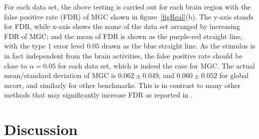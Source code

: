 \documentclass[11pt]{article}
\begin{document}
For each data set, the above testing is carried out for each brain region with the false positive rate (FDR) of MGC shown in figure~\ref{figReal}(b). The y-axis stands for FDR, while x-axis shows the name of the data set arranged by increasing FDR of MGC; and the mean of FDR is shown as the purple-red straight line, with the type $1$ error level $0.05$ drawn as the blue straight line. As the stimulus is in fact independent from the brain activities, the false positive rate should be close to $\alpha=0.05$ for each data set, which is indeed the case for MGC. The actual mean/standard deviation of MGC is $0.062 \pm 0.049$, and $0.060 \pm 0.052$ for global mcorr, and similarly for other benchmarks. This is in contrast to many other methods that may significantly increase FDR as reported in \cite{EklundKnutsson2012}.
%
%
%
%
%
%
%
%
%
%
%
%
%
%
%
%
%
%

\section{Discussion}
\label{conclu}
\end{document}
